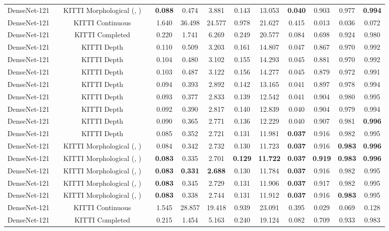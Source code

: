 \documentclass[5p]{elsarticle}
\begin{document}
\begin{table*}[]
{\begin{tabular}{c|c|c|c|cccccc|ccc}
DenseNet-121 &   & KITTI Morphological (, ) &  & \textbf{0.088} & 0.474 & 3.881 & 0.143 & 13.053 & \textbf{0.040} & 0.903 & 0.977 & \textbf{0.994} \\
DenseNet-121 &   & KITTI Continuous &  & 1.640 & 36.498 & 24.577 & 0.978 & 21.627 & 0.415 & 0.013 & 0.036 & 0.072 \\
DenseNet-121 &   & KITTI Completed &  & 0.220 & 1.741 & 6.269 & 0.249 & 20.577 & 0.084 & 0.698 & 0.924 & 0.980 
\\\hline\hline
DenseNet-121 &  & KITTI Depth &  & 0.110 & 0.509 & 3.203 & 0.161 & 14.807 & 0.047 & 0.867 & 0.970 & 0.992 \\
DenseNet-121 &  & KITTI Depth &  & 0.104 & 0.480 & 3.102 & 0.155 & 14.293 & 0.045 & 0.881 & 0.970 & 0.992 \\
DenseNet-121 &  & KITTI Depth &  & 0.103 & 0.487 & 3.122 & 0.156 & 14.277 & 0.045 & 0.879 & 0.972 & 0.991 \\
DenseNet-121 &  & KITTI Depth &  & 0.094 & 0.393 & 2.892 & 0.142 & 13.165 & 0.041 & 0.897 & 0.978 & 0.994 \\
DenseNet-121 &  & KITTI Depth &  & 0.093 & 0.377 & 2.833 & 0.139 & 12.542 & 0.041 & 0.904 & 0.980 & 0.995 \\
DenseNet-121 &  & KITTI Depth &  & 0.092 & 0.390 & 2.817 & 0.140 & 12.839 & 0.040 & 0.904 & 0.979 & 0.994 \\
DenseNet-121 &  & KITTI Depth &  & 0.090 & 0.365 & 2.771 & 0.136 & 12.229 & 0.040 & 0.907 & 0.981 & \textbf{0.996} \\
DenseNet-121 &   & KITTI Depth &  & 0.085 & 0.352 & 2.721 & 0.131 & 11.981 & \textbf{0.037} & 0.916 & 0.982 & 0.995 \\
DenseNet-121 &   & KITTI Morphological (, ) &  & 0.084 & 0.342 & 2.732 & 0.130 & 11.723 & \textbf{0.037} & 0.916 & \textbf{0.983} & \textbf{0.996} \\
DenseNet-121 &   & KITTI Morphological (, ) &  & \textbf{0.083} & 0.335 & 2.701 & \textbf{0.129} & \textbf{11.722} & \textbf{0.037} & \textbf{0.919} & \textbf{0.983} & \textbf{0.996} \\
DenseNet-121 &   & KITTI Morphological (, ) &  & \textbf{0.083} & \textbf{0.331} & \textbf{2.688} & 0.130 & 11.784 & \textbf{0.037} & 0.916 & 0.982 & 0.995 \\
DenseNet-121 &   & KITTI Morphological (, ) &  & \textbf{0.083} & 0.345 & 2.729 & 0.131 & 11.906 & \textbf{0.037} & 0.917 & 0.982 & 0.995 \\
DenseNet-121 &   & KITTI Morphological (, ) &  & \textbf{0.083} & 0.338 & 2.744 & 0.131 & 11.912 & \textbf{0.037} & 0.916 & \textbf{0.983} & 0.995 \\
DenseNet-121 &   & KITTI Continuous &  & 1.545 & 28.857 & 19.418 & 0.939 & 23.091 & 0.395 & 0.029 & 0.069 & 0.128 \\
DenseNet-121 &   & KITTI Completed &  & 0.215 & 1.454 & 5.163 & 0.240 & 19.124 & 0.082 & 0.709 & 0.933 & 0.983 
\\\hline
\end{tabular}
} 
\end{table*}
\end{document}
